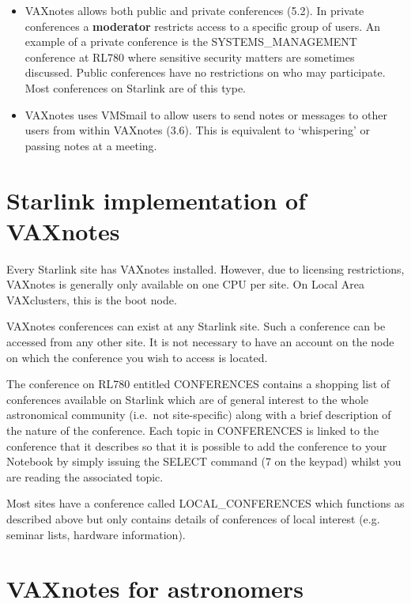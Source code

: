 \begin{itemize}
\item  VAXnotes allows both public and private conferences (5.2). In private
conferences a {\bf moderator} restricts access to a specific group
of users. An example of a private conference is the SYSTEMS\_MANAGEMENT
conference at RL780 where sensitive security matters are sometimes
discussed. Public conferences have no restrictions on who may participate.
Most conferences on Starlink are of this type.

\item VAXnotes uses VMSmail to allow users to send notes or messages to
other users from within VAXnotes (3.6). This is equivalent to `whispering'
or passing notes at a meeting.

\end{itemize}

\section {Starlink implementation of VAXnotes}

Every Starlink site has VAXnotes installed. However, due to licensing 
restrictions, VAXnotes is generally only available on one CPU per site. 
On Local Area VAXclusters, this is the boot node.

VAXnotes conferences can exist at any Starlink site. Such a
conference can be accessed from any other site. It is not necessary
to have an account on the node on which the conference you wish to
access is located.

The conference on RL780 entitled CONFERENCES contains a shopping list of 
conferences available on Starlink which are of general interest to
the whole astronomical community (i.e.\ not site-specific) along
with a brief description of the nature of the conference. Each topic
in CONFERENCES is linked to the conference that it describes
so that it is possible to add the conference to your Notebook
by simply issuing the SELECT command (7 on the keypad) whilst
you are reading the associated topic.

Most sites have a conference called LOCAL\_CONFERENCES which functions as 
described above but only contains details of conferences of local interest
(e.g. seminar lists, hardware information).



\section {VAXnotes for astronomers}

